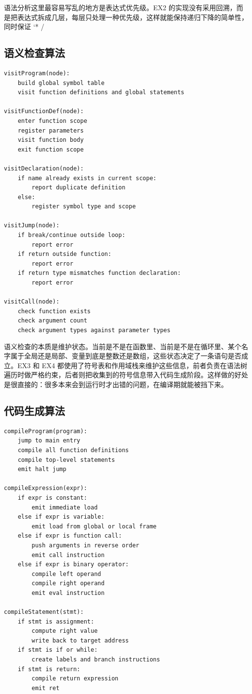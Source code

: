 \documentclass[UTF8,a4paper,12pt]{ctexart}
\begin{document}
语法分析这里最容易写乱的地方是表达式优先级。EX2 的实现没有采用回溯，而是把表达式拆成几层，每层只处理一种优先级，这样就能保持递归下降的简单性，同时保证 `* / %

\subsection*{语义检查算法}
\begin{lstlisting}[style=mandrillcode,caption={语义检查算法伪代码},label={lst:semantic-pseudo}]
visitProgram(node):
    build global symbol table
    visit function definitions and global statements

visitFunctionDef(node):
    enter function scope
    register parameters
    visit function body
    exit function scope

visitDeclaration(node):
    if name already exists in current scope:
        report duplicate definition
    else:
        register symbol type and scope

visitJump(node):
    if break/continue outside loop:
        report error
    if return outside function:
        report error
    if return type mismatches function declaration:
        report error

visitCall(node):
    check function exists
    check argument count
    check argument types against parameter types
\end{lstlisting}

语义检查的本质是维护状态。当前是不是在函数里、当前是不是在循环里、某个名字属于全局还是局部、变量到底是整数还是数组，这些状态决定了一条语句是否成立。EX3 和 EX4 都使用了符号表和作用域栈来维护这些信息，前者负责在语法树遍历时做严格约束，后者则把收集到的符号信息带入代码生成阶段。这样做的好处是很直接的：很多本来会到运行时才出错的问题，在编译期就能被挡下来。

\subsection*{代码生成算法}
\begin{lstlisting}[style=mandrillcode,caption={代码生成算法伪代码},label={lst:compiler-pseudo}]
compileProgram(program):
    jump to main entry
    compile all function definitions
    compile top-level statements
    emit halt jump

compileExpression(expr):
    if expr is constant:
        emit immediate load
    else if expr is variable:
        emit load from global or local frame
    else if expr is function call:
        push arguments in reverse order
        emit call instruction
    else if expr is binary operator:
        compile left operand
        compile right operand
        emit eval instruction

compileStatement(stmt):
    if stmt is assignment:
        compute right value
        write back to target address
    if stmt is if or while:
        create labels and branch instructions
    if stmt is return:
        compile return expression
        emit ret
\end{lstlisting}
\end{document}

